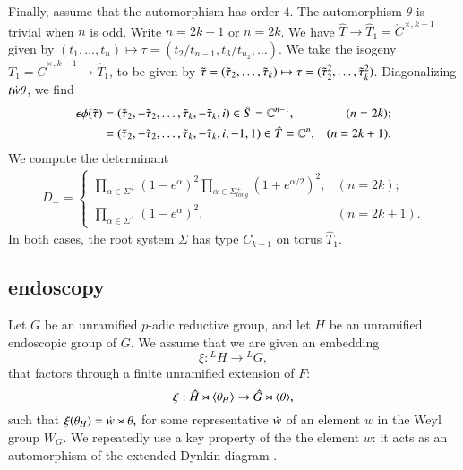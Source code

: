 Finally, assume that the automorphism has order $4$.
The automorphism $\theta$ is trivial when $n$ is odd.
Write $n=2k+1$ or $n=2k$.
We have $\hat T\to \hat T_1 = \ring{C}^{\times,k-1}$ given by
$(t_1,\ldots,t_n)\mapsto \tau = (t_2/t_{n-1},t_3/t_{n_2},\ldots)$.
We take the isogeny $\tilde T_1 =\ring{C}^{\times,k-1}\to \hat T_1$, to be given by $\tilde\tau = (\tilde\tau_2,\ldots,\tilde\tau_k)\mapsto \tau = (\tilde\tau_2^2,\ldots,\tilde\tau_k^2)$.
Diagonalizing $t\dot w\theta$, we find
\begin{align}
\epsilon\phi(\tilde\tau) &= (\tilde\tau_2,-\tilde\tau_2,\ldots,\tilde\tau_k,-\tilde\tau_k,i)\in \hat S=\mathbb{C}^{n-1},&(n=2k);\\
&= (\tilde\tau_2,-\tilde\tau_2,\ldots,\tilde\tau_k,-\tilde\tau_k,i,-1,1)\in \hat T = \mathbb{C}^n,&(n=2k+1).
\end{align}
We compute the determinant
\begin{align*}
D_+ = \begin{cases}\prod_{\alpha\in \Sigma^+} (1-e^\alpha)^2 \prod_{\alpha\in \Sigma^+_{long}} (1+e^{\alpha/2})^2,&(n=2k);\\
          \prod_{\alpha\in\Sigma^+} (1-e^\alpha)^2,&(n=2k+1).
          \end{cases}
\end{align*}
In both cases, the root system $\Sigma$ has type $C_{k-1}$ on torus $\hat T_1$.




\subsection{endoscopy}

Let $G$ be an unramified $p$-adic reductive group, and let $H$ be an unramified endoscopic
group of $G$.  We assume that we are given an embedding
\[
\xi:{}^LH\to {}^LG,
\]
that factors through a finite unramified extension of $F$:
\[
\xi:\hat H\rtimes \langle{\theta_H}\rangle\to \hat G\rtimes \langle{\theta}\rangle,
\]
such that $\xi(\theta_H) = \dot w  \rtimes \theta,$
for some representative $\dot w $ of an element $w$ in the Weyl group $W_G$.
We  repeatedly use a key property of the the element $w$: it acts as an automorphism of the extended Dynkin diagram
 \cite[\S4.7]{hales1993simple}.


